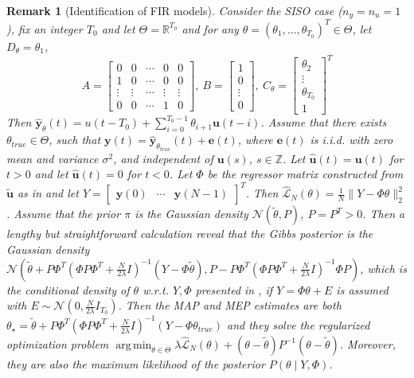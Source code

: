\documentclass{article}
\def\rve{{\mathbf{e}}}
\def\rvu{{\mathbf{i}}}
\def\rvu{{\mathbf{u}}}
\def\rvy{{\mathbf{y}}}
\DeclareMathOperator*{\argmin}{arg\,min}
\newtheorem{remark}[theorem]{Remark}
\begin{document}
\begin{remark}[Identification of FIR models]
    \label{rem:fir}
    Consider the SISO case ($n_y=n_u=1$), fix 
    an integer $T_0$ and let
    $\Theta=\mathbb{R}^{T_0}$ and 
    for any $\theta=(\theta_1,\ldots, \theta_{T_0})^T \in \Theta$, let
    $D_{\theta}=\theta_1$,
    \[ 
    A=\begin{bmatrix} 0 & 0 & \cdots & 0 & 0 \\ 
        1 & 0 & \cdots & 0 &0 \\
        \vdots & \vdots & \cdots & \vdots & \vdots \\
        0 & 0 & \cdots & 1 & 0
    \end{bmatrix}, ~ 
    B=\begin{bmatrix} 1 \\ 0 \\ \vdots \\ 0 \end{bmatrix}, ~
    C_\theta=\begin{bmatrix} \theta_2 \\ \vdots \\ \theta_{T_0} \\ 1 \end{bmatrix}^T
    \]
    Then $\hat{\rvy}_{\theta}(t)=u(t-T_0)+\sum_{i=0}^{T_0-1} \theta_{i+1} \rvu(t-i)$. Assume that there exists 
    $\theta_{true} \in \Theta$, such that 
    $\rvy(t)=\hat{\rvy}_{\theta_{true}}(t)+\rve(t)$,
    where $\rve(t)$ is i.i.d. with zero mean and variance $\sigma^2$, and independent of $\rvu(s)$, $s \in \mathbb{Z}$.
    Let $\hat{\rvu}(t)=\rvu(t)$ for $t > 0$ and
    let $\hat{\rvu}(t)=0$ for $t < 0$.
    Let $\Phi$ be the regressor matrix
    constructed from $\tilde{\rvu}$ as in
    \cite[(3.45), page 48]{pillonetto2022regularized} and
    let 
    $Y=\begin{bmatrix} \rvy(0) & \cdots &\rvy(N-1) \end{bmatrix}^T$.
    Then
    $\hat{\mathcal{L}}_N(\theta)=\frac{1}{N} \|Y-\Phi \theta\|_2^2$.
    Assume that the prior $\pi$ is the Gaussian density $\mathcal{N}(\tilde{\theta},P)$, $P=P^T > 0$. 
    Then a lengthy but straightforward calculation
    reveal that
    the Gibbs posterior is the  Gaussian density
    $\mathcal{N}(\tilde{\theta}+P\Phi^T(\Phi P \Phi^T + \frac{N}{2\lambda} I)^{-1}(Y-\Phi \tilde{\theta}), P-P\Phi^T(\Phi P\Phi^T + \frac{N}{2\lambda} I)^{-1}\Phi P)$, 
    which is the conditional density of
    $\theta$ w.r.t. $Y,\Phi$ presented in
    \cite[(4.6), page 101]{pillonetto2022regularized}, if
    $Y=\Phi\theta+E$ is assumed with 
    $E \sim \mathcal{N}(0,\frac{N}{2\lambda} I_{T_0})$.
    Then the MAP and MEP estimates are both
    $\theta_{\star}=\tilde{\theta}+P\Phi^T(\Phi P \Phi^T + \frac{N}{2\lambda} I)^{-1}(Y-\Phi \theta_{true})$
    and they solve  the regularized
    optimization problem
    $\argmin_{\theta \in \Theta} \lambda \hat{\mathcal{L}}_N(\theta) +  (\theta-\tilde{\theta})P^{-1}(\theta-\tilde{\theta})$. Moreover, they are also
    the maximum likelihood
    of the posterior $P(\theta \mid Y,\Phi)$. 


\end{remark}
\end{document}
